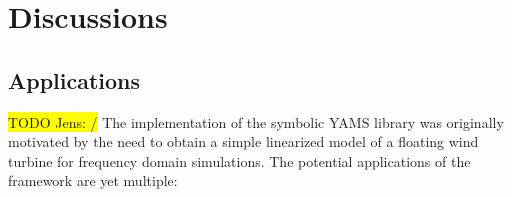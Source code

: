 \documentclass[wes, manuscript]{copernicus}
\newcommand{\todoJens}    [1]{{\colorbox{yellow}{TODO Jens:    }}{\color{red}{#1}}\colorbox{yellow}{/}}
\begin{document}
\section{Discussions}


\subsection{Applications}
\label{sec:Applications}
\todoJens{If possible add a tiny bit more on the applications. Not too much, just a bit because we said we would stress a bit more why this framework is useful.}
The implementation of the symbolic YAMS library was originally motivated by the need to obtain a simple linearized model of a floating wind turbine for frequency domain simulations.
The potential applications of the framework are yet multiple:
\end{document}
